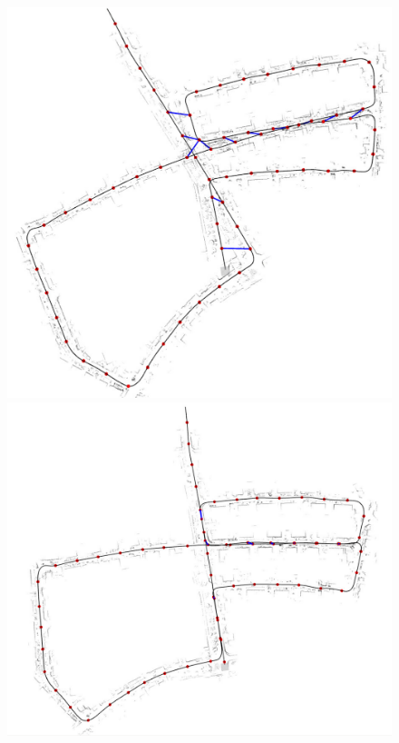 
\begin{figure}[!tbp]
  \centering
  \begin{minipage}[b]{0.4\textwidth}
    \includegraphics[width=\textwidth]{images/before_segmatch.pdf}
  \end{minipage}
  \hfill
  \begin{minipage}[b]{0.4\textwidth}
    \includegraphics[width=\textwidth]{images/after_segmatch.pdf}

\end{minipage}
\end{figure}

